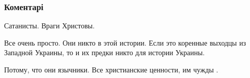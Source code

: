  
 
 
 
 
\subsubsection{Коментарі}

\begin{itemize}
 
Сатанисты. Враги Христовы.

 
Все очень просто. Они никто в этой истории. Если это коренные выходцы из Западной Украины, то и их предки никто для истории Украины.

 
Потому, что они язычники. Все христианские ценности, им чужды .
\end{itemize}

